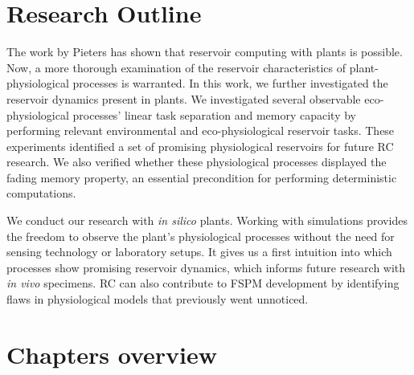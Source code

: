 \section{Research Outline}

The work by Pieters has shown that reservoir computing with plants is possible.
Now, a more thorough examination of the reservoir characteristics of plant-physiological processes is warranted.
In this work, we further investigated the reservoir dynamics present in plants.
We investigated several observable eco-physiological processes' linear task separation and memory capacity by performing relevant environmental and eco-physiological reservoir tasks. 
These experiments identified a set of promising physiological reservoirs for future RC research.
We also verified whether these physiological processes displayed the fading memory property, an essential precondition for performing deterministic computations.


We conduct our research with \textit{in silico} plants.
Working with simulations provides the freedom to observe the plant's physiological processes without the need for sensing technology or laboratory setups.
It gives us a first intuition into which processes show promising reservoir dynamics, which informs future research with \textit{in vivo} specimens.
RC can also contribute to FSPM development by identifying flaws in physiological models that previously went unnoticed.


\newpage
\section{Chapters overview}

